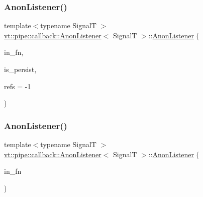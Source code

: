 \mbox{\label{structvt_1_1pipe_1_1callback_1_1_anon_listener_aa0b98d4f63eb9b2dbdb30ee37a867497}} 
\subsubsection{\texorpdfstring{Anon\+Listener()}{AnonListener()}\hspace{0.1cm}{\footnotesize\ttfamily [4/5]}}
{\footnotesize\ttfamily template$<$typename SignalT $>$ \\
\hyperlink{structvt_1_1pipe_1_1callback_1_1_anon_listener}{vt\+::pipe\+::callback\+::\+Anon\+Listener}$<$ SignalT $>$\+::\hyperlink{structvt_1_1pipe_1_1callback_1_1_anon_listener}{Anon\+Listener} (\begin{DoxyParamCaption}\item[{\hyperlink{structvt_1_1pipe_1_1callback_1_1_anon_listener_ad5d8a2cc6a1599642855e92bbd10f89c}{Callback\+Fn\+Type} const \&}]{in\+\_\+fn,  }\item[{bool}]{is\+\_\+persist,  }\item[{\hyperlink{namespacevt_ace18d74dd489d9ea506d38789fffce34}{Pipe\+Ref\+Type}}]{refs = {\ttfamily -\/1} }\end{DoxyParamCaption})}

\mbox{\label{structvt_1_1pipe_1_1callback_1_1_anon_listener_ad7eef759667c0dcff5506ab45e28eda4}} 
\subsubsection{\texorpdfstring{Anon\+Listener()}{AnonListener()}\hspace{0.1cm}{\footnotesize\ttfamily [5/5]}}
{\footnotesize\ttfamily template$<$typename SignalT $>$ \\
\hyperlink{structvt_1_1pipe_1_1callback_1_1_anon_listener}{vt\+::pipe\+::callback\+::\+Anon\+Listener}$<$ SignalT $>$\+::\hyperlink{structvt_1_1pipe_1_1callback_1_1_anon_listener}{Anon\+Listener} (\begin{DoxyParamCaption}\item[{\hyperlink{structvt_1_1pipe_1_1callback_1_1_anon_listener_ad5d8a2cc6a1599642855e92bbd10f89c}{Callback\+Fn\+Type} const \&}]{in\+\_\+fn }\end{DoxyParamCaption})\hspace{0.3cm}{\ttfamily [explicit]}}



